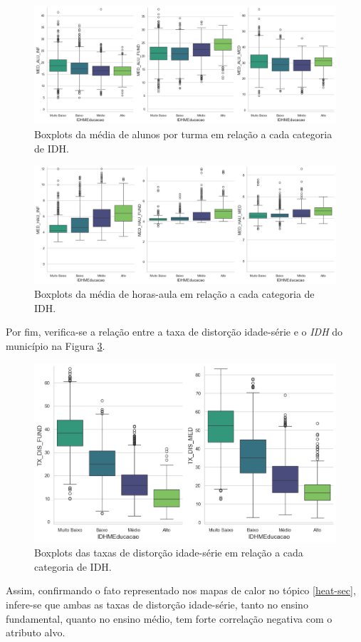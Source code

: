 \begin{figure}[H]
    \centering
    \includegraphics[scale = 0.3]{Graphics/BoxAlunosIDH.png}
    \caption{Boxplots da média de alunos por turma em relação a cada categoria de IDH.}
    \label{fig:disp-malu}
\end{figure}

\begin{figure}[H]
    \centering
    \includegraphics[scale = 0.3]{Graphics/BoxHorasIDH.png}
    \caption{Boxplots da média de horas-aula em relação a cada categoria de IDH.}
    \label{fig:disp-mhau}
\end{figure}

\par Por fim, verifica-se a relação entre a taxa de distorção idade-série e o \textit{IDH} do município na Figura \ref{fig:disp-dis}.

\begin{figure}[H]
    \centering
    \includegraphics[scale = 0.3]{Graphics/BocDistorcaoIDH.png}
    \caption{Boxplots das taxas de distorção idade-série em relação a cada categoria de IDH.}
    \label{fig:disp-dis}
\end{figure}

Assim, confirmando o fato representado nos mapas de calor no tópico \ref{heat-sec}, infere-se que ambas as taxas de distorção idade-série, tanto no ensino fundamental, quanto no ensino médio, tem forte correlação negativa com o atributo alvo.